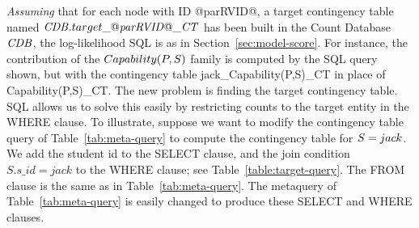 {\em Assuming} that for each node with ID @parRVID@, a target contingency table named $\CDB.target\_@\it{parRVID}@\_\cttable$ has been built in the Count Database $\CDB$, the log-likelihood SQL is as in Section~\ref{sec:model-score}. For instance, the contribution of the $Capability(\P,\S)$ family is computed by the SQL query shown,  but with the contingency table jack\_Capability(P,S)\_CT in place of Capability(P,S)\_CT.
%
The new problem is finding the target contingency table. SQL allows us to solve this easily by restricting counts to the target entity in the WHERE clause. To illustrate, suppose we want to modify the contingency table query of Table~\ref{tab:meta-query} to compute the contingency table for $\S = jack$. We add the student id to the SELECT clause, and the join condition $S.s\_id = jack$ to the WHERE clause; see Table~\ref{table:target-query}. %
The FROM clause is the same as in Table~\ref{tab:meta-query}. The metaquery of Table~\ref{tab:meta-query} is easily changed to produce these SELECT and WHERE clauses.


%
%
%

